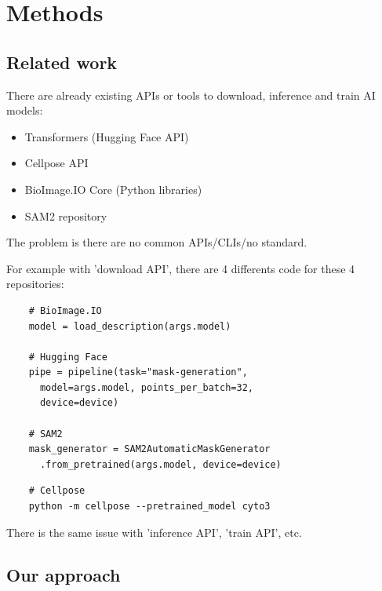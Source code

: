 \section{Methods}
\label{sec:methods}

\subsection{Related work}

There are already existing APIs or tools to download, inference and train AI
models:
\begin{itemize}
  \item Transformers (Hugging Face API) \cite{wolf-etal-2020-transformers}
  \item Cellpose API \cite{Stringer2020.02.02.931238}
  \item BioImage.IO Core (Python libraries)
  \item SAM2 repository \cite{ravi2024sam2}
\end{itemize}

The problem is there are no common APIs/CLIs/no standard.

For example with 'download API', there are 4 differents code for these 4 repositories:

\begin{listing}[H]
  \begin{verbatim}
    # BioImage.IO
    model = load_description(args.model)

    # Hugging Face
    pipe = pipeline(task="mask-generation",
      model=args.model, points_per_batch=32,
      device=device)

    # SAM2
    mask_generator = SAM2AutomaticMaskGenerator
      .from_pretrained(args.model, device=device)
  \end{verbatim}

  \begin{verbatim}
    # Cellpose
    python -m cellpose --pretrained_model cyto3
  \end{verbatim}
\end{listing}

There is the same issue with 'inference API', 'train API', etc.

\subsection{Our approach}

